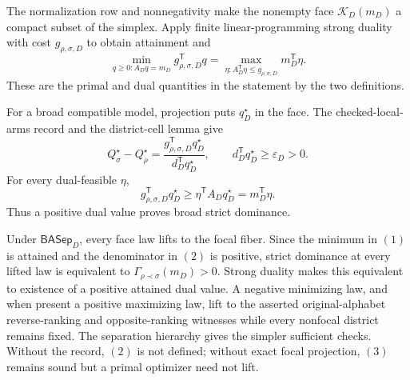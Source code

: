 The normalization row and nonnegativity make the nonempty face \(\mathcal K_D(m_D)\) a compact subset of the simplex.  Apply finite linear-programming strong duality with cost \(g_{\rho,\sigma,D}\) to obtain attainment and
\[
\min_{q\geq0:A_Dq=m_D}g_{\rho,\sigma,D}^{\mathsf T}q
=\max_{\eta:A_D^{\mathsf T}\eta\leq g_{\rho,\sigma,D}}
m_D^{\mathsf T}\eta.
\tag{1}
\]
These are the primal and dual quantities in the statement by the two definitions.

For a broad compatible model, projection puts \(q_D^\star\) in the face.  The checked-local-arms record and the district-cell lemma give
\[
Q_\sigma^\star-Q_\rho^\star
=\frac{g_{\rho,\sigma,D}^{\mathsf T}q_D^\star}
{d_D^{\mathsf T}q_D^\star},
\qquad
d_D^{\mathsf T}q_D^\star\geq\varepsilon_D>0.
\tag{2}
\]
For every dual-feasible \(\eta\),
\[
g_{\rho,\sigma,D}^{\mathsf T}q_D^\star
\geq\eta^{\mathsf T}A_Dq_D^\star
=m_D^{\mathsf T}\eta.
\tag{3}
\]
Thus a positive dual value proves broad strict dominance.

Under \(\mathsf{BASep}_D\), every face law lifts to the focal fiber.  Since the minimum in \((1)\) is attained and the denominator in \((2)\) is positive, strict dominance at every lifted law is equivalent to \(\Gamma_{\rho\prec\sigma}(m_D)>0\).  Strong duality makes this equivalent to existence of a positive attained dual value.  A negative minimizing law, and when present a positive maximizing law, lift to the asserted original-alphabet reverse-ranking and opposite-ranking witnesses while every nonfocal district remains fixed.  The separation hierarchy gives the simpler sufficient checks.  Without the record, \((2)\) is not defined; without exact focal projection, \((3)\) remains sound but a primal optimizer need not lift.